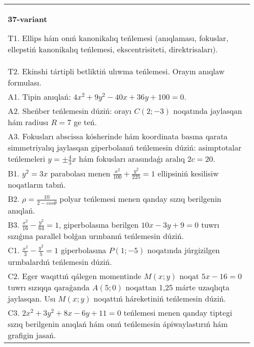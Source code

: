 \documentclass{article}
\begin{document}
\begin{tabular}{m{17cm}}
\textbf{37-variant}
\newline

T1. Ellips hám onıń kanonikalıq teńlemesi (anıqlaması, fokuslar, ellepstiń kanonikalıq teńlemesi, ekscentrisiteti, direktrisaları).\\

T2. Ekinshi tártipli betliktiń ulıwma teńlemesi. Orayın anıqlaw formulası.\\

A1. Tipin anıqlań: $4 x^2+9 y^2-40 x+36 y+100=0$.\\

A2. Sheńber teńlemesin dúziń: orayı $C (2;-3) $ noqatında jaylasqan hám radiusı $R=7$ ge teń.\\

A3. Fokusları abscissa kósherinde hám koordinata basına qarata simmetriyalıq jaylasqan giperbolanıń teńlemesin dúziń: asimptotalar teńlemeleri $y=\pm \frac{4}{3}x$ hám fokusları arasındaǵı aralıq $2 c=20$.\\

B1. $y^{2} = 3x$ parabolası menen $\frac{x^{2}}{100} + \frac{y^{2}}{225} = 1$ ellipsiniń kesilisiw noqatların tabıń.  \\

B2. $\rho = \frac{10}{2 - cos\theta}$ polyar teńlemesi menen qanday sızıq berilgenin anıqlań.  \\

B3. $\frac{x^{2}}{16} - \frac{y^{2}}{64} = 1$, giperbolasına berilgen $10x - 3y + 9 = 0$ tuwrı sızıǵına parallel bolǵan urınbanıń teńlemesin dúziń.  \\

C1. $\frac{x^{2}}{3} - \frac{y^{2}}{5} = 1$ giperbolasına $P(1; - 5)$ noqatında júrgizilgen urınbalardıń teńlemesin dúziń.\\

C2. Eger waqıttıń qálegen momentinde $M(x;y)$ noqat $5x - 16 = 0$ tuwrı sızıqqa qaraǵanda $A(5;0)$ noqattan 1,25 márte uzaqlıqta jaylasqan. Usı $M(x;y)$ noqattıń háreketiniń teńlemesin dúziń.  \\

C3. $2x^{2} + 3y^{2} + 8x - 6y + 11 = 0$ teńlemesi menen qanday tiptegi sızıq berilgenin anıqlań hám onıń teńlemesin ápiwaylastırıń hám grafigin jasań.  \\

\end{tabular}
\vspace{1cm}
\end{document}
